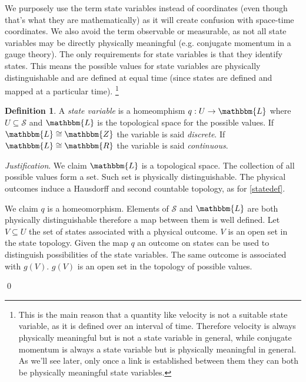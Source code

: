 \documentclass[aps,pra,10pt,twocolumn,floatfix,nofootinbib]{revtex4-1}
\theoremstyle{definition}
\newtheorem{defn}[prop]{Definition}
\newenvironment{justification}{\emph{Justification}.}{\qed}
\begin{document}
We purposely use the term state variables instead of coordinates (even though that's what they are mathematically) as it will create confusion with space-time coordinates. We also avoid the term observable or measurable, as not all state variables may be directly physically meaningful (e.g. conjugate momentum in a gauge theory). The only requirements for state variables is that they identify states. This means the possible values for state variables are physically distinguishable and are defined at equal time (since states are defined and mapped at a particular time). \footnote{This is the main reason that a quantity like velocity is not a suitable state variable, as it is  defined over an interval of time. Therefore velocity is always physically meaningful but is not a state variable in general, while conjugate momentum is always a state variable but is physically meaningful in general. As we'll see later, only once a link is established between them they can both be physically meaningful state variables.}

\begin{defn}\label{state_variable}
	A \emph{state variable} is a homeomphism $q : U \rightarrow \mathbbm{L}$ where $U \subseteq \mathcal{S}$ and $\mathbbm{L}$ is the topological space for the possible values. If $\mathbbm{L}\cong \mathbbm{Z}$ the variable is said \emph{discrete}. If $\mathbbm{L}\cong \mathbbm{R}$ the variable is said \emph{continuous}.
\end{defn}

\begin{justification}
	We claim $\mathbbm{L}$ is a topological space. The collection of all possible values form a set. Such set is physically distinguishable. The physical outcomes induce a Hausdorff and second countable topology, as for \ref{statedef}.
	
	We claim $q$ is a homeomorphism. Elements of $\mathcal{S}$ and $\mathbbm{L}$ are both physically distinguishable therefore a map between them is well defined. Let $V \subseteq U$ the set of states associated with a physical outcome. $V$ is an open set in the state topology. Given the map $q$ an outcome on states can be used to distinguish possibilities of the state variables. The same outcome is associated with $g(V)$. $g(V)$ is an open set in the topology of possible values.

\end{justification}
\end{document}
